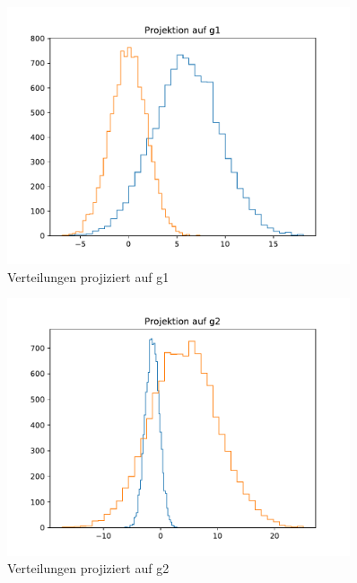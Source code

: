 \begin{figure}[H]
  \centering
  \includegraphics[width=0.9\textwidth]{13_P0_g1.pdf}
  \caption{Verteilungen projiziert auf g1}
\end{figure}


\begin{figure}[H]
  \centering
  \includegraphics[width=0.9\textwidth]{13_P0_g2.pdf}
  \caption{Verteilungen projiziert auf g2}
\end{figure}

